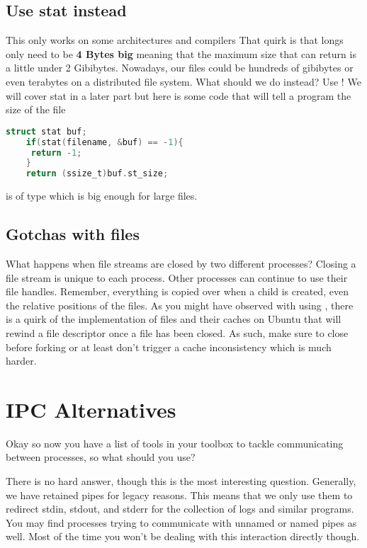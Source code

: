 	\subsection{Use stat instead}
	 
	This only works on some architectures and compilers
	That quirk is that longs only need to be \textbf{4 Bytes big} meaning that the maximum size that  can return is a little under 2 Gibibytes.
	Nowadays, our files could be hundreds of gibibytes or even terabytes on a distributed file system.
	What should we do instead? Use ! We will cover stat in a later part but here is some code that will tell a program the size of the file
	 
	\begin{lstlisting}[language=C]
	struct stat buf;
	if(stat(filename, &buf) == -1){
	 return -1;
	}
	return (ssize_t)buf.st_size;
	\end{lstlisting}
	 
	 is of type  which is big enough for large files.
	 
	\subsection{Gotchas with files}
	 
	What happens when file streams are closed by two different processes?
	Closing a file stream is unique to each process.
	Other processes can continue to use their file handles.
	Remember, everything is copied over when a child is created, even the relative positions of the files.
	As you might have observed with using , there is a quirk of the implementation of files and their caches on Ubuntu that will rewind a file descriptor once a file has been closed.
	As such, make sure to close before forking or at least don't trigger a cache inconsistency which is much harder.
	 
	\section{IPC Alternatives}
	 
	Okay so now you have a list of tools in your toolbox to tackle communicating between processes, so what should you use?
	 
	There is no hard answer, though this is the most interesting question.
	Generally, we have retained pipes for legacy reasons.
	This means that we only use them to redirect stdin, stdout, and stderr for the collection of logs and similar programs.
	You may find processes trying to communicate with unnamed or named pipes as well.
	Most of the time you won't be dealing with this interaction directly though.
	 
